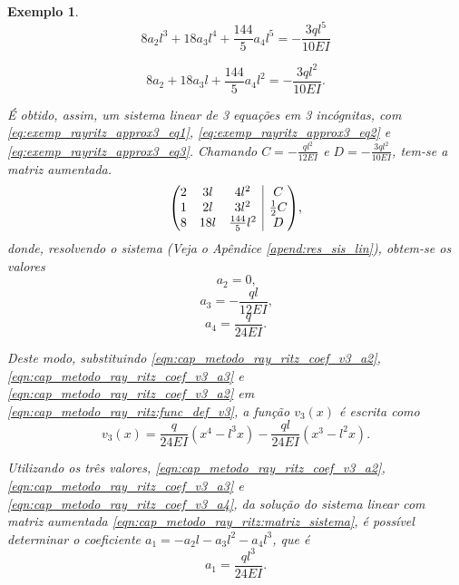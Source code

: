 \documentclass[
	12pt,				%
	openright,			%
    twoside,			%
	a4paper,			%
	english,			%
	french,				%
	spanish,			%
	brazil				%
	]{abntex2}
\makeatletter
\newenvironment{amatrix}[1]{%
  \left(\begin{array}{@{}*{#1}{c}|c@{}}
}{%
  \end{array}\right)
}
\newtheorem{exemplo}{Exemplo}
\numberwithin{lema}{chapter}
\numberwithin{teorema}{chapter}
\numberwithin{definicao}{chapter}
\numberwithin{exemplo}{chapter}
\numberwithin{figure}{chapter}
\makeatother
\begin{document}
\begin{exemplo}
	$$
		8a_2 l^3 + 18 a_3 l^4 + \frac{144}{5} a_4 l^5
		=
		-\frac{3ql^5}{10EI}
	$$
	
	\begin{equation}
		\label{eq:exemp_rayritz_approx3_eq3}
		8a_2 + 18a_3 l + \frac{144}{5} a_4 l^2 
		=
		-\frac{3ql^2}{10EI}
		\text{.}
	\end{equation}
	
	É obtido, assim, um sistema linear de 3 equações em 3 incógnitas, com \eqref{eq:exemp_rayritz_approx3_eq1}, \eqref{eq:exemp_rayritz_approx3_eq2} e \eqref{eq:exemp_rayritz_approx3_eq3}. Chamando $C=-\frac{ql^2}{12EI}$ e $D=-\frac{3ql^2}{10EI}$, tem-se a matriz aumentada.
	\begin{equation}
		\label{eqn:cap_metodo_ray_ritz:matriz_sistema}
		\begin{amatrix}{3}
			2	& 	3l	&	4l^2 				& C \\
			1	& 	2l	&	3l^2			 	& \frac{1}{2}C \\
			8 	& 	18l & 	\frac{144}{5} l^2	& D
		\end{amatrix}
		\text{,}
	\end{equation}
	donde, resolvendo o sistema (Veja o Apêndice \ref{apend:res_sis_lin}), obtem-se os valores
	\begin{equation}
		\label{eqn:cap_metodo_ray_ritz_coef_v3_a2}
		a_2=0\text{,}
	\end{equation}
	\begin{equation}
		\label{eqn:cap_metodo_ray_ritz_coef_v3_a3}
		a_3=-\frac{ql}{12EI}\text{,}
	\end{equation}
	\begin{equation}
		\label{eqn:cap_metodo_ray_ritz_coef_v3_a4}
		a_4=\frac{q}{24EI}\text{.}
	\end{equation}
		
	Deste modo, substituindo \eqref{eqn:cap_metodo_ray_ritz_coef_v3_a2}, \eqref{eqn:cap_metodo_ray_ritz_coef_v3_a3} e \eqref{eqn:cap_metodo_ray_ritz_coef_v3_a2} em \eqref{eqn:cap_metodo_ray_ritz:func_def_v3}, a função $v_3(x)$ é escrita como
	\begin{equation}
		\label{eqn:cap_metodo_ray_ritz:func_v3}
		v_3(x) =
		\frac{q}{24EI} ( x^4 - l^3 x )
		-
		\frac{ql}{24EI} ( x^3 - l^2 x )
		\text{.}
	\end{equation}
	
	Utilizando os três valores, \eqref{eqn:cap_metodo_ray_ritz_coef_v3_a2}, \eqref{eqn:cap_metodo_ray_ritz_coef_v3_a3} e \eqref{eqn:cap_metodo_ray_ritz_coef_v3_a4}, da solução do sistema linear com matriz aumentada \eqref{eqn:cap_metodo_ray_ritz:matriz_sistema}, é possível determinar o coeficiente $a_1=-a_2l-a_3l^2-a_4l^3$, que é
	\begin{equation}
		\label{eqn:cap_metodo_ray_ritz_coef_v3_a1}
		a_1 = \frac{ql^3}{24EI}
		\text{.}
	\end{equation}	
	

\end{exemplo}
\end{document}
